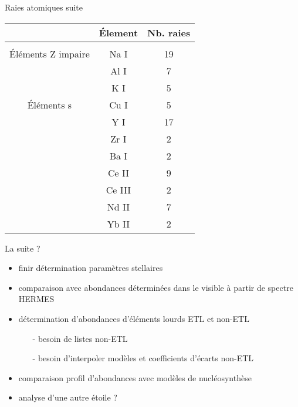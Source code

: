 \documentclass[10pt]{beamer}
\begin{document}
\begin{frame}[fragile]{Raies atomiques suite}

    \begin{table}[h!]
        \begin{center}
            \begin{tabular}{c|c|c}
                &Élement&Nb. raies\\
                \hline
                &&\\ 
                Éléments Z impaire & Na I &19\\
                 & Al I &7\\
                 & K I &5 \\
                Éléments s & Cu I & 5\\
                 & Y I & 17\\
                 & Zr I & 2\\
                 & Ba I & 2\\
                 & Ce II & 9\\
                 & Ce III & 2\\
                 & Nd II & 7\\
                 & Yb II & 2\\
            \end{tabular}
        \end{center}
    \end{table}

\end{frame}

\begin{frame}[fragile]{La suite ?}
    \begin{itemize}
        \item finir détermination paramètres stellaires
        \item comparaison avec abondances déterminées dans le visible à partir de spectre HERMES
        \item détermination  d'abondances d'éléments lourds ETL et non-ETL
        \begin{itemize}
            \item [-] besoin de listes non-ETL
            \item [-] besoin d'interpoler modèles et coefficients d'écarts non-ETL
        \end{itemize}
        \item comparaison profil d'abondances avec modèles de nucléosynthèse
        \item analyse d'une autre étoile ?
    \end{itemize} 
\end{frame}
\end{document}
